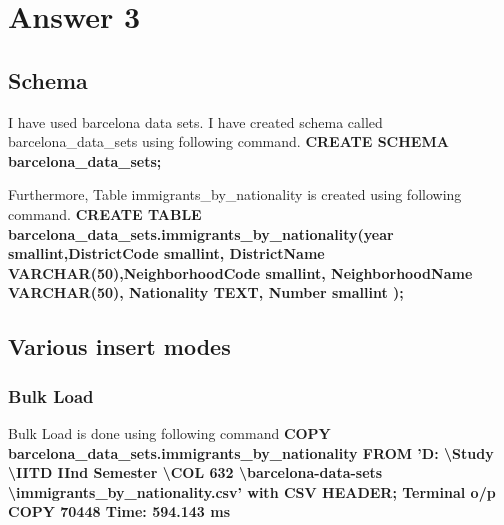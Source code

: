 \documentclass[10pt]{article}
\begin{document}
\section{Answer 3}
\subsection{Schema}
 I have used barcelona data sets.
 I  have created schema called barcelona\_data\_sets using following command. 
\newline
\newline
\textbf{ CREATE SCHEMA barcelona\_data\_sets;}
\newline
\newline

Furthermore, Table immigrants\_by\_nationality is created using following command.
\newline
\newline
\textbf{CREATE TABLE barcelona\_data\_sets.immigrants\_by\_nationality(year smallint,DistrictCode smallint, DistrictName VARCHAR(50),NeighborhoodCode smallint, NeighborhoodName VARCHAR(50), Nationality TEXT, Number smallint ); }
\subsection{Various insert modes}
\subsubsection{Bulk Load}

Bulk Load is done using following command
\newline
\newline \textbf{ COPY barcelona\_data\_sets.immigrants\_by\_nationality FROM 'D: \textbackslash Study \textbackslash IITD IInd Semester \textbackslash COL 632 \textbackslash barcelona-data-sets \textbackslash immigrants\_by\_nationality.csv' with CSV HEADER;
\newline \newline Terminal o/p
\newline COPY 70448
\newline Time: 594.143 ms
}
\end{document}
